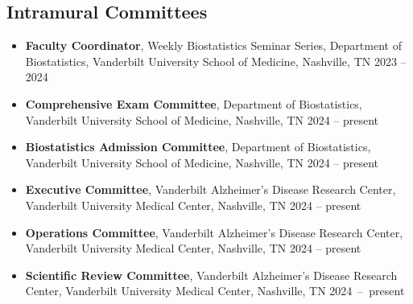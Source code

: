 \documentclass[12pt,letterpaper]{article}
\newenvironment{cventry}{\begin{minipage}[t]{\linewidth}}{\end{minipage}}
\begin{document}
	\subsection*{Intramural Committees}
	\begin{itemize}
		\item\begin{cventry} {\bf Faculty Coordinator}, Weekly Biostatistics 
		Seminar Series, Department of Biostatistics, Vanderbilt 
		University School of Medicine, Nashville, TN \hfill 2023 -- 
		2024
		\par\end{cventry}
		\item\begin{cventry} {\bf Comprehensive Exam Committee}, Department of 
		Biostatistics, Vanderbilt University School of Medicine, 
		Nashville, TN \hfill 2024 -- present
		\par\end{cventry}
		\item\begin{cventry} {\bf Biostatistics Admission Committee}, Department of 
		Biostatistics, Vanderbilt University School of Medicine, 
		Nashville, TN \hfill 2024 -- present
		\par\end{cventry}
		\item\begin{cventry} {\bf Executive Committee}, Vanderbilt Alzheimer's 
		Disease Research Center, Vanderbilt University Medical 
		Center, Nashville, TN \hfill 2024 -- present
		\par\end{cventry}
		\item\begin{cventry} {\bf Operations Committee}, Vanderbilt Alzheimer's 
		Disease Research Center, Vanderbilt University Medical 
		Center, Nashville, TN \hfill 2024 -- present
		\par\end{cventry}
		\item\begin{cventry} {\bf Scientific Review Committee}, Vanderbilt 
		Alzheimer's Disease Research Center, Vanderbilt University 
		Medical Center, Nashville, TN \hfill \mbox{2024 -- present}
		\par\end{cventry}
	\end{itemize}
	
\end{document}
